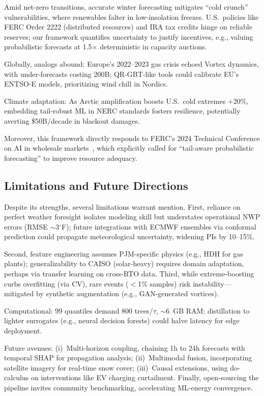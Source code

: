 \documentclass[12pt,a4paper]{article}
\begin{document}
Amid net-zero transitions, accurate winter forecasting mitigates ``cold crunch'' vulnerabilities, where renewables falter in low-insolation freezes. U.S.\ policies like FERC Order 2222 (distributed resources) and IRA tax credits hinge on reliable reserves; our framework quantifies uncertainty to justify incentives, e.g., valuing probabilistic forecasts at 1.5$\times$ deterministic in capacity auctions.

Globally, analogs abound: Europe's 2022--2023 gas crisis echoed Vortex dynamics, with under-forecasts costing \texteuro 200B; QR-GBT-like tools could calibrate EU's ENTSO-E models, prioritizing wind chill in Nordics.

Climate adaptation: As Arctic amplification boosts U.S.\ cold extremes $+$20\%, embedding tail-robust ML in NERC standards fosters resilience, potentially averting \$50B/decade in blackout damages.

Moreover, this framework directly responds to FERC's 2024 Technical Conference on AI in wholesale markets~\cite{ferc2024ai}, which explicitly called for ``tail-aware probabilistic forecasting'' to improve resource adequacy.

\subsection{Limitations and Future Directions}

Despite its strengths, several limitations warrant mention. First, reliance on perfect weather foresight isolates modeling skill but understates operational NWP errors (RMSE $\sim$3$^\circ$F); future integrations with ECMWF ensembles via conformal prediction could propagate meteorological uncertainty, widening PIs by 10--15\%.

Second, feature engineering assumes PJM-specific physics (e.g., HDH for gas plants); generalizability to CAISO (solar-heavy) requires domain adaptation, perhaps via transfer learning on cross-RTO data. Third, while extreme-boosting curbs overfitting (via CV), rare events ($<$1\% samples) risk instability---mitigated by synthetic augmentation (e.g., GAN-generated vortices).

Computational: 99 quantiles demand 800 trees/$\tau$, $\sim$6~GB RAM; distillation to lighter surrogates (e.g., neural decision forests) could halve latency for edge deployment.

Future avenues: (i)~Multi-horizon coupling, chaining 1h to 24h forecasts with temporal SHAP for propagation analysis; (ii)~Multimodal fusion, incorporating satellite imagery for real-time snow cover; (iii)~Causal extensions, using do-calculus on interventions like EV charging curtailment. Finally, open-sourcing the pipeline invites community benchmarking, accelerating ML-energy convergence.
\end{document}
